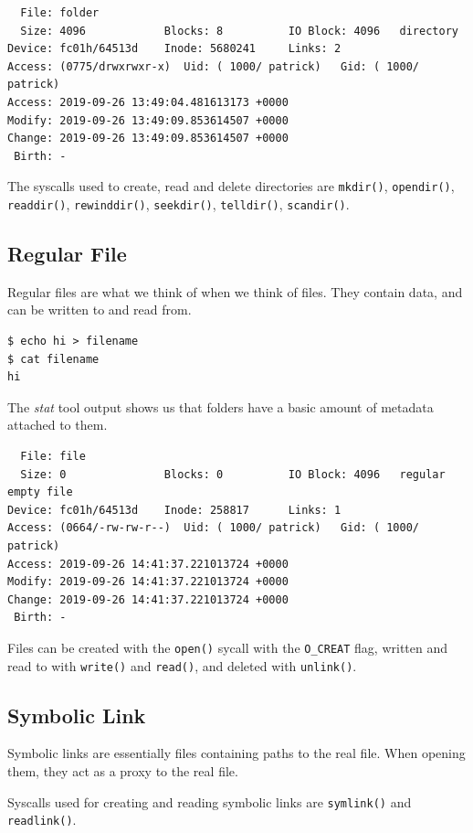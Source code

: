 \documentclass[a4paper]{article}
\begin{document}
\begin{verbatim}
  File: folder
  Size: 4096            Blocks: 8          IO Block: 4096   directory
Device: fc01h/64513d    Inode: 5680241     Links: 2
Access: (0775/drwxrwxr-x)  Uid: ( 1000/ patrick)   Gid: ( 1000/ patrick)
Access: 2019-09-26 13:49:04.481613173 +0000
Modify: 2019-09-26 13:49:09.853614507 +0000
Change: 2019-09-26 13:49:09.853614507 +0000
 Birth: -  
\end{verbatim}

The syscalls used to create, read and delete directories are \verb|mkdir()|, \verb|opendir()|, \verb|readdir()|, \verb|rewinddir()|, \verb|seekdir()|, \verb|telldir()|, \verb|scandir()|.

\subsection{Regular File}

Regular files are what we think of when we think of files. They contain data, and can be written to and read from.

\begin{verbatim}
$ echo hi > filename
$ cat filename
hi  
\end{verbatim}
The \emph{stat} tool output shows us that folders have a basic amount of metadata attached to them.

\begin{verbatim}
  File: file
  Size: 0               Blocks: 0          IO Block: 4096   regular empty file
Device: fc01h/64513d    Inode: 258817      Links: 1
Access: (0664/-rw-rw-r--)  Uid: ( 1000/ patrick)   Gid: ( 1000/ patrick)
Access: 2019-09-26 14:41:37.221013724 +0000
Modify: 2019-09-26 14:41:37.221013724 +0000
Change: 2019-09-26 14:41:37.221013724 +0000
 Birth: -
\end{verbatim}

Files can be created with the \verb|open()| sycall with the \verb|O_CREAT| flag, written and read to with \verb|write()| and \verb|read()|, and deleted with \verb|unlink()|.

\subsection{Symbolic Link}

Symbolic links are essentially files containing paths to the real file. When opening them, they act as a proxy to the real file. 

Syscalls used for creating and reading symbolic links are \verb|symlink()| and \verb|readlink()|.
\end{document}
